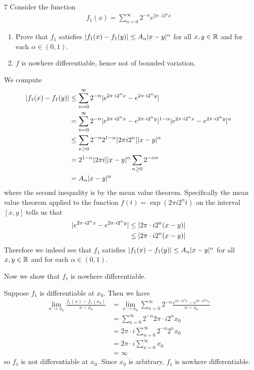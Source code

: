 \documentclass{scrartcl}
\begin{document}
\begin{problem}{7}
    Consider the function 
    \begin{align*}
        f_1(x) = \sum_{n=0}^\infty 2^{-n}e^{2\pi\cdot i2^nx}
    \end{align*} \begin{enumerate}
        \item Prove that $f_1$ satisfies $\lvert f_1(x)-f_1(y)\vert\leq A_\alpha\lvert x-y\vert^\alpha$ for all $x,y\in\mathbb{R}$ and for each $\alpha\in(0,1)$.
        \item $f$ is nowhere differentiable, hence not of bounded variation.
    \end{enumerate}
\end{problem}

\begin{solution}
We compute \begin{align*}
    \lvert f_1(x) - f_1(y)\vert &\leq \sum_{n=0}^\infty 2^{-n}\lvert e^{2\pi\cdot i2^nx} - e^{2\pi\cdot i2^ny}\vert \\
    &= \sum_{n=0}^\infty 2^{-n}\lvert e^{2\pi\cdot i2^nx} - e^{2\pi\cdot i2^ny}\vert^{1-\alpha} \lvert e^{2\pi\cdot i2^nx} - e^{2\pi\cdot i2^ny}\vert^{\alpha} \\
    &\leq \sum_{n\geq 0}2^{-n}2^{1-\alpha}\lvert 2\pi i 2^n\vert\lvert x-y\vert^\alpha \\
    &= 2^{1-\alpha}\lvert 2\pi i\vert\lvert x-y\vert^\alpha \sum_{n\geq 0}2^{-\alpha n} \\
    &= A_\alpha\lvert x-y\vert^\alpha
\end{align*} where the second inequality is by the mean value theorem.
Specifically the mean value theorem applied to the function $f(t) = \exp(2\pi i2^nt)$ on the interval $[x,y]$ tells us that \begin{align*}
    \lvert e^{2\pi\cdot i2^nx} - e^{2\pi\cdot i2^ny}\vert &\leq \lvert 2\pi\cdot i2^n(x-y)\vert \\
    &\leq \lvert 2\pi\cdot i2^n(x-y)\vert
\end{align*}
Therefore we indeed see that $f_1$ satisfies $\lvert f_1(x)-f_1(y)\vert\leq A_\alpha\lvert x-y\vert^\alpha$ for all $x,y\in\mathbb{R}$ and for each $\alpha\in(0,1)$.

Now we show that $f_1$ is nowhere differentiable. 

Suppose $f_1$ is differentiable at $x_0$. Then we have \begin{align*}
    \lim_{x\to x_0}\frac{f_1(x)-f_1(x_0)}{x-x_0} &= \lim_{x\to x_0}\sum_{n=0}^\infty 2^{-n}\frac{e^{2\pi\cdot i2^nx} - e^{2\pi\cdot i2^nx_0}}{x-x_0} \\
    &= \sum_{n=0}^\infty 2^{-n}2\pi\cdot i2^nx_0  \\
    &= 2\pi\cdot i\sum_{n=0}^\infty 2^{-n}2^nx_0 \\
    &= 2\pi\cdot i\sum_{n=0}^\infty x_0 \\
    &= \infty
\end{align*} so $f_1$ is not differentiable at $x_0$. Since $x_0$ is arbitrary, $f_1$ is nowhere differentiable.
\end{solution}
\end{document}
